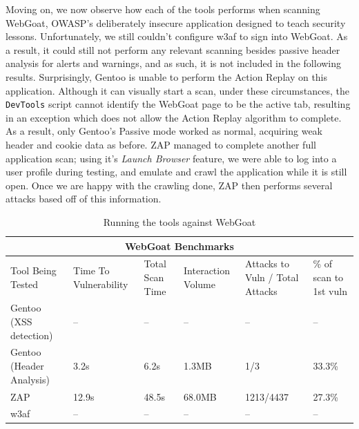 Moving on, we now observe how each of the tools performs when scanning WebGoat, OWASP's deliberately insecure application designed to teach security lessons. Unfortunately, we still couldn't configure w3af to sign into WebGoat. As a result, it could still not perform any relevant scanning besides passive header analysis for alerts and warnings, and as such, it is not included in the following results. Surprisingly, Gentoo is unable to perform the Action Replay on this application. Although it can visually start a scan, under these circumstances, the \texttt{DevTools} script cannot identify the WebGoat page to be the active tab, resulting in an exception which does not allow the Action Replay algorithm to complete. As a result, only Gentoo's Passive mode worked as normal, acquiring weak header and cookie data as before. ZAP managed to complete another full application scan; using it's \textit{Launch Browser} feature, we were able to log into a user profile during testing, and emulate and crawl the application while it is still open. Once we are happy with the crawling done, ZAP then performs several attacks based off of this information. \\

\begin{table}[h]
	
	{
		\captionsetup{justification=centering}		
		\caption{Running the tools against WebGoat}
		\label{table:webgoat_benchmarks}
		\begin{tabular}{ |p{4cm}||p{1.4cm}|p{1.4cm}|p{1.6cm}|p{2cm}|p{2cm}| }
			\hline
			\multicolumn{6}{|c|}{\textbf{WebGoat Benchmarks}} \\ [0.5ex]
			\hline \hline 
			Tool Being Tested& Time To Vulnerability & Total Scan Time & Interaction Volume & Attacks to Vuln / Total Attacks & \% of scan to 1st vuln \\
			\hline
			Gentoo (XSS detection)    & --     & --    &   --          & -- & -- \\
			Gentoo (Header Analysis) &  3.2s   & 6.2s   & 1.3MB   & 1/3 & 33.3\%\\
			ZAP                                   & 12.9s &  48.5s   & 68.0MB  & 1213/4437 & 27.3\%\\ 
			w3af                                 & -- & -- & -- & -- & -- \\
			\hline
		\end{tabular}
	} \\
\end{table}



